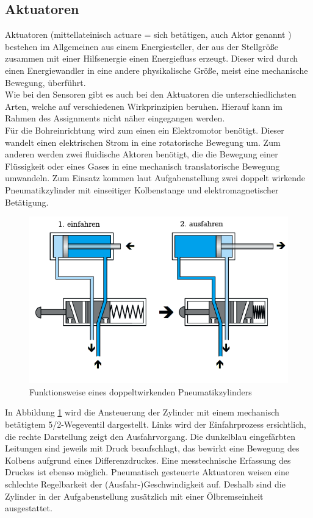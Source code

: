 \subsection{Aktuatoren}
Aktuatoren (mittellateinisch actuare = sich betätigen, auch Aktor genannt \autocite{Aktuator}) bestehen im Allgemeinen aus einem Energiesteller, der aus der Stellgröße zusammen mit einer Hilfsenergie einen Energiefluss erzeugt. Dieser wird durch einen Energiewandler in eine andere physikalische Größe, meist eine mechanische Bewegung, überführt.\autocite[vgl.][30\psqq]{Heimann2016}\\
Wie bei den Sensoren gibt es auch bei den Aktuatoren die unterschiedlichsten Arten, welche auf verschiedenen Wirkprinzipien beruhen. Hierauf kann im Rahmen des Assign\-ments nicht näher eingegangen werden.\\
Für die Bohreinrichtung wird zum einen ein Elektromotor benötigt. Dieser wandelt einen elektrischen Strom in eine rotatorische Bewegung um. Zum anderen werden zwei fluidische Aktoren benötigt, die die Bewegung einer Flüssigkeit oder eines Gases in eine mechanisch translatorische Bewegung umwandeln. Zum Einsatz kommen laut Aufgabenstellung zwei doppelt wirkende Pneumatikzylinder mit einseitiger Kolbenstange und elektromagnetischer Betätigung.
\begin{figure}[H]
   \centering
    \includegraphics[scale=0.5]{Bilder/Zylinder.png}
    \caption[doppeltwirkender Pneumatikzylinder]{Funktionsweise eines doppeltwirkenden Pneumatikzylinders
    \footnotemark}
    \label{fig:Zylinder}
\end{figure}
In Abbildung \ref{fig:Zylinder} wird die Ansteuerung der Zylinder mit einem mechanisch betätigtem 5/2-Wegeventil dargestellt. Links wird der Einfahrprozess ersichtlich, die rechte Darstellung zeigt den Ausfahrvorgang. Die dunkelblau eingefärbten Leitungen sind jeweils mit Druck beaufschlagt, das bewirkt eine Bewegung des Kolbens aufgrund eines Differenzdruckes. Eine messtechnische Erfassung des Druckes ist ebenso möglich. Pneumatisch gesteuerte Aktuatoren weisen eine schlechte Regelbarkeit der \mbox{(Ausfahr-)Geschwindigkeit} auf. Deshalb sind die Zylinder in der Aufgabenstellung zusätzlich mit einer Ölbremseinheit ausgestattet. \autocite[vgl.][54\psq]{Heimann2016}
